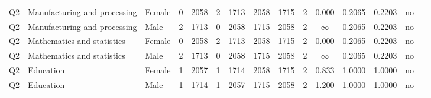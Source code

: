 \begin{longtable}{lllrcccccccccll}
Q2 & Manufacturing and processing & Female & 0 & 2058 & 2 & 1713 & 2058 & 1715 & 2 & 0.000 & 0.2065 & 0.2203 & no \\
Q2 & Manufacturing and processing & Male & 2 & 1713 & 0 & 2058 & 1715 & 2058 & 2 & $\infty$ & 0.2065 & 0.2203 & no \\
Q2 & Mathematics and statistics & Female & 0 & 2058 & 2 & 1713 & 2058 & 1715 & 2 & 0.000 & 0.2065 & 0.2203 & no \\
Q2 & Mathematics and statistics & Male & 2 & 1713 & 0 & 2058 & 1715 & 2058 & 2 & $\infty$ & 0.2065 & 0.2203 & no \\
Q2 & Education & Female & 1 & 2057 & 1 & 1714 & 2058 & 1715 & 2 & 0.833 & 1.0000 & 1.0000 & no \\
Q2 & Education & Male & 1 & 1714 & 1 & 2057 & 1715 & 2058 & 2 & 1.200 & 1.0000 & 1.0000 & no \\
\end{longtable}
